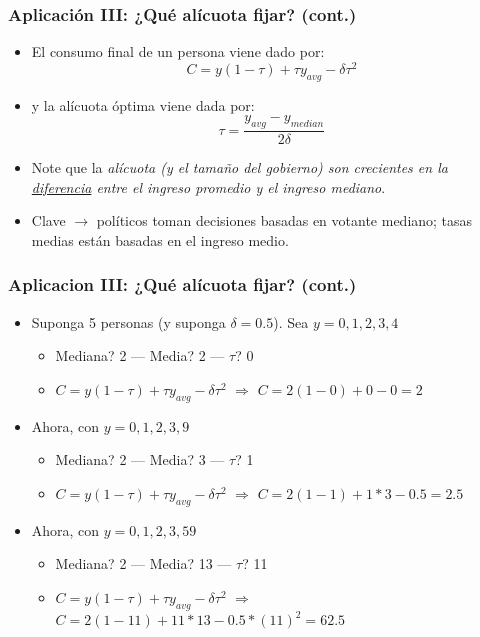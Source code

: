 \documentclass[14pt,aspectratio=169]{beamer}
\begin{document}
\begin{frame}\frametitle{Aplicación III: ¿Qué alícuota fijar? (cont.)}
\begin{itemize}\itemsep 15pt
\item El consumo final de un persona viene dado por:
\begin{equation}
C=y(1-\tau)+\tau y_{avg}-\delta \tau^2
\end{equation}
\item y la alícuota óptima viene dada por:
\begin{equation}
\tau=\frac{y_{avg}-y_{median}}{2\delta}
\end{equation}
\item Note que la \textit{alícuota (y el tamaño del gobierno) son crecientes
  en la \underline{diferencia} entre el ingreso promedio y el ingreso mediano}. 
\item Clave $\longrightarrow$ políticos toman decisiones
  basadas en votante mediano; tasas
  medias están basadas en el ingreso medio. 
\end{itemize}
\end{frame}

\begin{frame}\frametitle{Aplicacion III: ¿Qué alícuota fijar? (cont.)}
\begin{itemize}
\item Suponga 5 personas (y suponga $\delta=0.5$). Sea $y={0,1,2,3,4}$
\begin{itemize}\itemsep 0pt \medskip
\item Mediana? 2 ---  Media? 2 --- $\tau$? 0
\item $C=y(1-\tau)+\tau y_{avg}-\delta \tau^2$ $\Rightarrow$ $C=2(1-0)+0-0=2$
\end{itemize}
\item Ahora, con $y={0,1,2,3,9}$
\begin{itemize}\itemsep 0pt \medskip
\item Mediana? 2 --- Media? 3 --- $\tau$? 1
\item $C=y(1-\tau)+\tau y_{avg}-\delta \tau^2$ $\Rightarrow$ $C=2(1-1)+1*3-0.5=2.5$
\end{itemize}
\item Ahora, con $y={0,1,2,3,59}$
\begin{itemize}\itemsep 0pt \medskip
\item Mediana? 2 --- Media? 13 --- $\tau$? 11
\item $C=y(1-\tau)+\tau y_{avg}-\delta \tau^2$ $\Rightarrow$ $C=2(1-11)+11*13-0.5*(11)^2=62.5$
\end{itemize}
\end{itemize}
\end{frame}
\end{document}
